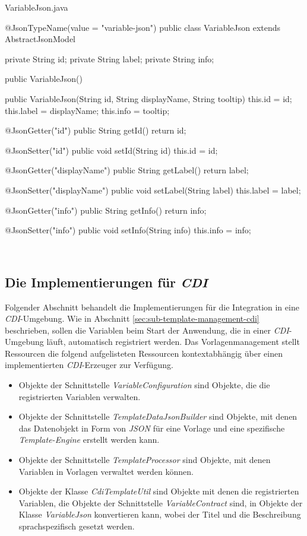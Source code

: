 \begin{program}[h]
\caption{VariableJson.java}
\label{prog:variableJson}
\begin{JsCode}
@JsonTypeName(value = "variable-json")
public class VariableJson extends AbstractJsonModel {

    private String id;
    private String label;
    private String info;

    public VariableJson() {
    }

    public VariableJson(String id, String displayName, String tooltip) {
        this.id = id;
        this.label = displayName;
        this.info = tooltip;
    }

    @JsonGetter("id")
    public String getId() { return id; }

    @JsonSetter("id")
    public void setId(String id) { this.id = id; }

    @JsonGetter("displayName")
    public String getLabel() { return label; }

    @JsonSetter("displayName")
    public void setLabel(String label) { this.label = label; }

    @JsonGetter("info")
    public String getInfo() { return info; }

    @JsonSetter("info")
    public void setInfo(String info) { this.info = info; }
}
\end{JsCode}
\end{program}
\ \newpage

\subsection{Die Implementierungen für \emph{CDI}}
Folgender Abschnitt behandelt die Implementierungen für die Integration in eine \emph{CDI}-Umgebung. Wie in Abschnitt \ref{sec:sub-template-management-cdi} beschrieben, sollen die Variablen beim Start der Anwendung, die in einer \emph{CDI}-Umgebung läuft, automatisch  registriert werden. Das Vorlagenmanagement stellt Ressourcen die folgend aufgelisteten Ressourcen kontextabhängig über einen implementierten \emph{CDI}-Erzeuger zur Verfügung. 
\begin{itemize}
 \item Objekte der Schnittstelle \emph{VariableConfiguration} sind Objekte, die die registrierten Variablen verwalten.
 \item Objekte der Schnittstelle \emph{TemplateDataJsonBuilder} sind Objekte, mit denen das Datenobjekt in Form von \emph{JSON} für eine Vorlage und eine spezifische \emph{Template-Engine} erstellt werden kann.
 \item Objekte der Schnittstelle \emph{TemplateProcessor} sind Objekte, mit denen Variablen in Vorlagen verwaltet werden können.
 \item Objekte der Klasse \emph{CdiTemplateUtil} sind Objekte mit denen die registrierten Variablen, die Objekte der Schnittstelle \emph{VariableContract} sind, in Objekte der Klasse \emph{VariableJson} konvertieren kann, wobei der Titel und die Beschreibung sprachspezifisch gesetzt werden.
\end{itemize}

